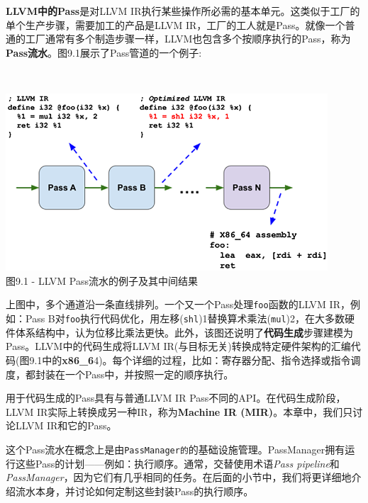 
\textbf{LLVM中的Pass}是对LLVM IR执行某些操作所必需的基本单元。这类似于工厂的单个生产步骤，需要加工的产品是LLVM IR，工厂的工人就是Pass。就像一个普通的工厂通常有多个制造步骤一样，LLVM也包含多个按顺序执行的Pass，称为\textbf{Pass流水}。图9.1展示了Pass管道的一个例子:

\hspace*{\fill} \\ %
\begin{center}
\includegraphics[width=0.9\textwidth]{content/3/chapter9/images/1.png}\\
图9.1 - LLVM Pass流水的例子及其中间结果
\end{center}

上图中，多个通道沿一条直线排列。一个又一个Pass处理\texttt{foo}函数的LLVM IR，例如：Pass B对\texttt{foo}执行代码优化，用左移(\texttt{shl})1替换算术乘法(\texttt{mul})2，在大多数硬件体系结构中，认为位移比乘法更快。此外，该图还说明了\textbf{代码生成}步骤建模为Pass。LLVM中的代码生成将LLVM IR(与目标无关)转换成特定硬件架构的汇编代码(图9.1中的\textbf{x86\_6}4)。每个详细的过程，比如：寄存器分配、指令选择或指令调度，都封装在一个Pass中，并按照一定的顺序执行。

\begin{tcolorbox}[colback=blue!5!white,colframe=blue!75!black, fonttitle=\bfseries,title=代码生成Pass]	
\hspace*{0.7cm}用于代码生成的Pass具有与普通LLVM IR Pass不同的API。在代码生成阶段，LLVM IR实际上转换成另一种IR，称为\textbf{Machine IR (MIR)}。本章中，我们只讨论LLVM IR和它的Pass。
\end{tcolorbox}

这个Pass流水在概念上是由\texttt{PassManager的}的基础设施管理。PassManager拥有运行这些Pass的计划——例如：执行顺序。通常，交替使用术语\textit{Pass pipeline}和\textit{PassManager}，因为它们有几乎相同的任务。在后面的小节中，我们将更详细地介绍流水本身，并讨论如何定制这些封装Pass的执行顺序。

